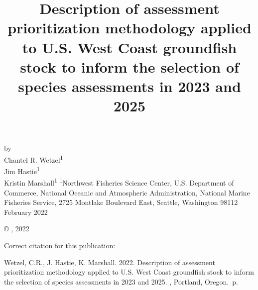 \documentclass[11pt,
  english,
  a4paper,
]{article}
\date{}
\newcommand{\trTitle}{Description of assessment prioritization methodology applied to U.S. West Coast groundfish stock to inform the selection of species assessments in 2023 and 2025}
\newcommand{\trYear}{2022}
\newcommand{\trMonth}{February}
\newcommand{\trAuthsBack}{Wetzel, C.R., J. Hastie, K. Marshall}
\newcommand{\trCitation}{
\begin{hangparas}{1em}{1}
\trAuthsBack{}. \trYear{}. \trTitle{}. \glsentrylong{pfmc}, Portland, Oregon. \pageref{LastPage}{}\,p.
\end{hangparas}}
\begin{document}

\renewcommand*{\thefootnote}{\fnsymbol{footnote}}

\small
\thispagestyle{empty}
\noindent
\begin{center}
\title{Description of assessment prioritization methodology applied to U.S. West Coast groundfish stock to inform the selection of species assessments in 2023 and 2025}
\vspace{1.5cm}
{\Large\textbf{}}
\vfill
by\\
Chantel R. Wetzel\textsuperscript{1}\\
Jim Hastie\textsuperscript{1}\\
Kristin Marshall\textsuperscript{1}\vfill
\textsuperscript{1}Northwest Fisheries Science Center, U.S. Department of Commerce, National Oceanic and Atmospheric Administration, National Marine Fisheries Service, 2725 Montlake Boulevard East, Seattle, Washington 98112\vfill
\trMonth{} \trYear{}
\end{center}
\clearpage

\thispagestyle{empty}
\vspace*{\fill}
\begin{center}
\copyright{} , \trYear{}\\
\end{center}
\par
\bigskip
\noindent
Correct citation for this publication:
\bigskip
\par
\trCitation{}
\clearpage


\tableofcontents\clearpage
\label{TRlastRoman}
\clearpage

\newpage
\thispagestyle{empty} %

\pagestyle{plain}  %
\renewcommand*{\thefootnote}{\arabic{footnote}}  %
\setcounter{footnote}{0}  %
\renewcommand{\headrulewidth}{0.5pt}
\renewcommand{\footrulewidth}{0.5pt}
\end{document}

